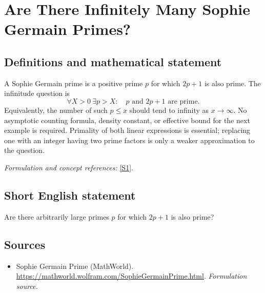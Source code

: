 \documentclass[11pt]{article}
\begin{document}
\section*{\texorpdfstring{Are There Infinitely Many Sophie Germain Primes?}{Are There Infinitely Many Sophie Germain Primes?}}\label{1137}
\subsection{Definitions and mathematical statement}
A Sophie Germain prime is a positive prime $p$ for which $2p+1$ is also prime. The infinitude question is
\[
 \forall X>0\ \exists p>X:\quad p\text{ and }2p+1\text{ are prime}.
\]
Equivalently, the number of such $p\le x$ should tend to infinity as $x\to\infty$. No asymptotic counting formula, density constant, or effective bound for the next example is required. Primality of both linear expressions is essential; replacing one with an integer having two prime factors is only a weaker approximation to the question.
\par\smallskip\textit{Formulation and concept references:} \href{https://mathworld.wolfram.com/SophieGermainPrime.html}{[S1]}.

\subsection{Short English statement}
Are there arbitrarily large primes $p$ for which $2p+1$ is also prime?
\subsection{Sources}
\begin{itemize}
\item[S1]Sophie Germain Prime (MathWorld).
\url{https://mathworld.wolfram.com/SophieGermainPrime.html}.
\textit{Formulation source.}
\end{itemize}
\end{document}
